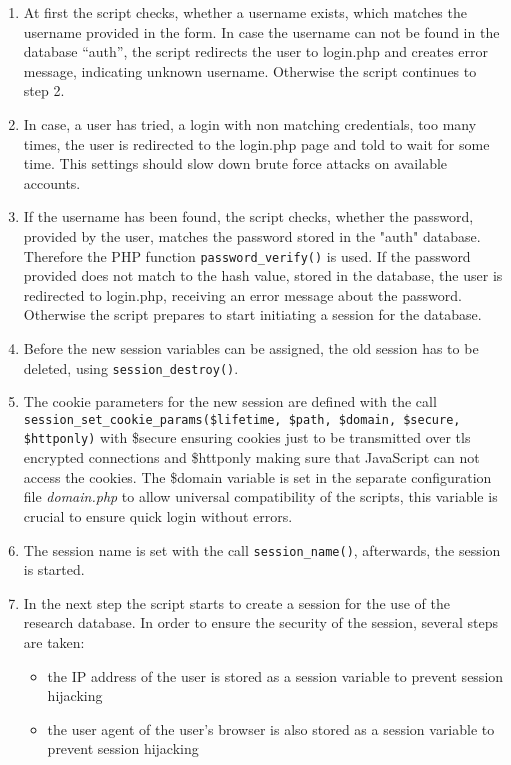 \begin{enumerate}
 \item At first the script checks, whether a username exists, which matches the username provided in the form. In case the username can not be found in the database ``auth'', the script
 redirects the user to login.php and creates error message, indicating unknown username. Otherwise the script continues to step 2.
 \item In case, a user has tried, a login with non matching credentials, too many times, the user is redirected to the login.php page and told to wait for some time. This settings 
 should slow down brute force attacks on available accounts.
 \item If the username has been found, the script checks, whether the password, provided by the user, matches the password stored in the "auth" database. Therefore the PHP function 
 \texttt{password\_verify()} is used. If the password provided does not match to the hash value, stored in the database, the user is redirected to login.php, receiving an error message about the 
 password. Otherwise the script prepares to start initiating a session for the database. 
 \item Before the new session variables can be assigned, the old session has to be deleted, using \texttt{session\_destroy()}.
 \item The cookie parameters for the new session are defined with the call \texttt{session\_set\_cookie\_params(\$lifetime, \$path, \$domain, \$secure, \$httponly)} with \$secure ensuring cookies just 
 to be transmitted over tls encrypted connections and \$httponly making sure that JavaScript can not access the cookies. The \$domain variable is set in the separate configuration file \emph{domain.php} 
 to allow universal compatibility of the scripts, this variable is crucial to ensure quick login without errors.
 \item The session name is set with the call \texttt{session\_name()}, afterwards, the session is started.
 \item In the next step the script starts to create a session for the use of the research database. In order to ensure the security of the session, several steps are taken:
 \begin{itemize}
  \item the IP address of the user is stored as a session variable to prevent session hijacking
  \item the user agent of the user's browser is also stored as a session variable to prevent session hijacking

\end{itemize}
\end{enumerate}
